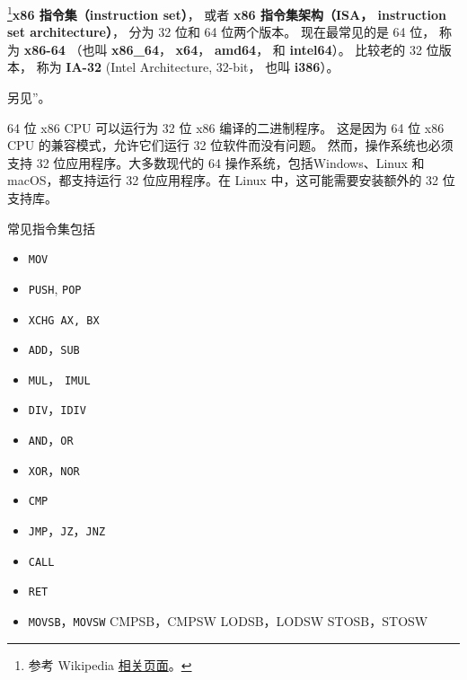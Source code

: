 
\begin{issues}
\issueDraft
\end{issues}

\footnote{参考 Wikipedia \href{https://en.wikipedia.org/wiki/X86-64}{相关页面}。}\textbf{x86 指令集（instruction set）}， 或者 \textbf{x86 指令集架构（ISA， instruction set architecture）}， 分为 32 位和 64 位两个版本。 现在最常见的是 64 位， 称为 \textbf{x86-64} （也叫 \textbf{x86_64}， \textbf{x64}， \textbf{amd64}， 和 \textbf{intel64}）。 比较老的 32 位版本， 称为 \textbf{IA-32} (Intel Architecture, 32-bit， 也叫 \textbf{i386}）。

另见”。

64 位 x86 CPU 可以运行为 32 位 x86 编译的二进制程序。 这是因为 64 位 x86 CPU 的兼容模式，允许它们运行 32 位软件而没有问题。 然而，操作系统也必须支持 32 位应用程序。大多数现代的 64 操作系统，包括Windows、Linux 和 macOS，都支持运行 32 位应用程序。在 Linux 中，这可能需要安装额外的 32 位支持库。

常见指令集包括
\begin{itemize}
\item \verb`MOV`
\item \verb`PUSH`, \verb`POP`
\item \verb`XCHG AX, BX`
\end{itemize}

\begin{itemize}
\item \verb`ADD`，\verb`SUB`
\item \verb`MUL`， \verb`IMUL`
\item \verb`DIV`，\verb`IDIV`
\end{itemize}

\begin{itemize}
\item \verb`AND`，\verb`OR`
\item \verb`XOR`，\verb`NOR`
\end{itemize}

\begin{itemize}
\item \verb`CMP`
\item \verb`JMP`，\verb`JZ`，\verb`JNZ`
\item \verb`CALL`
\item \verb`RET`
\end{itemize}

\begin{itemize}
\item \verb`MOVSB`，\verb`MOVSW`
CMPSB，CMPSW
LODSB，LODSW
STOSB，STOSW
\end{itemize}

